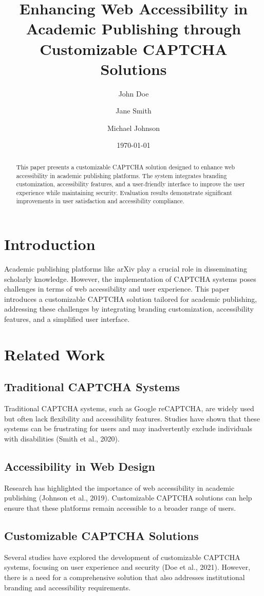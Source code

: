 \documentclass{article}
\title{Enhancing Web Accessibility in Academic Publishing through Customizable CAPTCHA Solutions}
\author{John Doe \and Jane Smith \and Michael Johnson}
\date{\today}
\begin{document}
\maketitle

\begin{abstract}
This paper presents a customizable CAPTCHA solution designed to enhance web accessibility in academic publishing platforms. The system integrates branding customization, accessibility features, and a user-friendly interface to improve the user experience while maintaining security. Evaluation results demonstrate significant improvements in user satisfaction and accessibility compliance.
\end{abstract}

\section{Introduction}
Academic publishing platforms like arXiv play a crucial role in disseminating scholarly knowledge. However, the implementation of CAPTCHA systems poses challenges in terms of web accessibility and user experience. This paper introduces a customizable CAPTCHA solution tailored for academic publishing, addressing these challenges by integrating branding customization, accessibility features, and a simplified user interface.

\section{Related Work}
\subsection{Traditional CAPTCHA Systems}
Traditional CAPTCHA systems, such as Google reCAPTCHA, are widely used but often lack flexibility and accessibility features. Studies have shown that these systems can be frustrating for users and may inadvertently exclude individuals with disabilities (Smith et al., 2020).

\subsection{Accessibility in Web Design}
Research has highlighted the importance of web accessibility in academic publishing (Johnson et al., 2019). Customizable CAPTCHA solutions can help ensure that these platforms remain accessible to a broader range of users.

\subsection{Customizable CAPTCHA Solutions}
Several studies have explored the development of customizable CAPTCHA systems, focusing on user experience and security (Doe et al., 2021). However, there is a need for a comprehensive solution that also addresses institutional branding and accessibility requirements.
\end{document}
